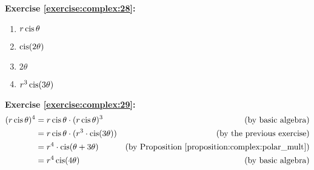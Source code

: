\noindent\textbf{Exercise \ref{exercise:complex:28}:} %
\begin{multicols}{2}
\begin{enumerate}
\item
$r\operatorname{cis}\theta$

\item
$\operatorname{cis}(2\theta)$

\item
$2\theta$

\item
$r^{3}\operatorname{cis}(3\theta)$
\end{enumerate}
\end{multicols}

\noindent\textbf{Exercise \ref{exercise:complex:29}:} %
\begin{align*}
(r\cis\theta)^{4} &= r\cis\theta \cdot (r\cis\theta)^{3} &\text{(by basic algebra)}\\
&=  r\cis\theta \cdot (r^{3} \cdot \cis(3\theta)) &\text{(by the previous exercise)}\\
&=  r^{4} \cdot \cis( \theta +  3\theta) & \mbox{(by Proposition \ref{proposition:complex:polar_mult})}\\
&=   r^{4}\cis(4\theta) & \mbox{(by basic algebra)}
\end{align*}

